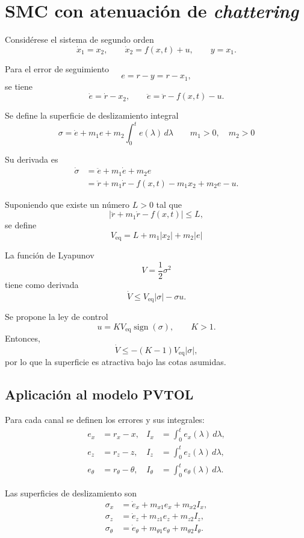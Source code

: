 \clearpage

\section{SMC con atenuación de \textit{chattering}}

Considérese el sistema de segundo orden
\[
  \dot x_1=x_2,\qquad
  \dot x_2=f(x,t)+u,\qquad
  y=x_1.
\]

Para el error de seguimiento
\[
  e=r-y=r-x_1,
\]
se tiene
\[
  \dot e=\dot r-x_2,
  \qquad
  \ddot e=\ddot r-f(x,t)-u.
\]

Se define la superficie de deslizamiento integral
\[
  \boxed{\sigma=\dot e+m_1e+m_2\int_0^t e(\lambda)\,d\lambda}
  \qquad m_1>0,\quad m_2>0
\]

Su derivada es
\begin{align*}
  \dot\sigma
  &=\ddot e+m_1\dot e+m_2e\\
  &=\ddot r+m_1\dot r-f(x,t)-m_1x_2+m_2e-u.
\end{align*}

Suponiendo que existe un número \(L>0\) tal que
\[
  \left|\ddot r+m_1\dot r-f(x,t)\right|\leq L,
\]
se define
\[
  \boxed{V_{\mathrm{eq}}=L+m_1|x_2|+m_2|e|}
\]

La función de Lyapunov
\[
  V=\frac{1}{2}\sigma^2
\]
tiene como derivada
\[
  \dot V
  \leq
  V_{\mathrm{eq}}|\sigma|-\sigma u.
\]

Se propone la ley de control
\[
  \boxed{u=K V_{\mathrm{eq}}\operatorname{sign}(\sigma)},
  \qquad K>1.
\]
Entonces,
\[
  \dot V
  \leq
  -(K-1)V_{\mathrm{eq}}|\sigma|,
\]
por lo que la superficie es atractiva bajo las cotas asumidas.

\subsection{Aplicación al modelo PVTOL}

Para cada canal se definen los errores y sus integrales:
\begin{align*}
  e_x&=r_x-x, &
  I_x&=\int_0^t e_x(\lambda)\,d\lambda,\\
  e_z&=r_z-z, &
  I_z&=\int_0^t e_z(\lambda)\,d\lambda,\\
  e_\theta&=r_\theta-\theta, &
  I_\theta&=\int_0^t e_\theta(\lambda)\,d\lambda.
\end{align*}

Las superficies de deslizamiento son
\begin{align*}
  \sigma_x&=\dot e_x+m_{x1}e_x+m_{x2}I_x,\\
  \sigma_z&=\dot e_z+m_{z1}e_z+m_{z2}I_z,\\
  \sigma_\theta&=\dot e_\theta
  +m_{\theta1}e_\theta+m_{\theta2}I_\theta.
\end{align*}

